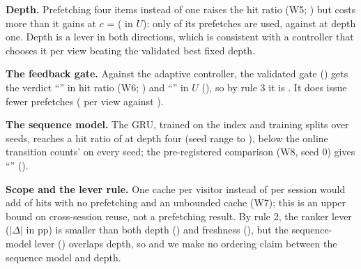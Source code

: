 \textbf{Depth.} Prefetching four items instead of one raises the hit ratio
(W5; \decWebWFiveHitDepthCI) but costs more than it gains at $c$ =
\webHeadlineCost{} (\decWebWFiveUtilityDepthCI{} in $U$): only
\webPrecisionLogisticCapEightFixedFour{} of its prefetches are used, against
\webPrecisionLogisticCapEightFixedOne{} at depth one. Depth is a lever in both
directions, which is consistent with a controller that chooses it per view
beating the validated best fixed depth.

\textbf{The feedback gate.} Against the adaptive controller, the validated
gate (\polFeedback) gets the verdict ``\decWebWSixHitFeedbackVerdict'' in hit
ratio (W6; \decWebWSixHitFeedbackCI) and ``\decWebWSixUtilityFeedbackVerdict''
in $U$ (\decWebWSixUtilityFeedbackCI), so by rule 3 it is
\decWebRuleThreeVerdict. It does issue fewer prefetches
(\webIssuedLogisticCapEightFeedbackZeroPointZeroOneEpsZeroPointZeroZeroFive{} per
view against \webIssuedLogisticCapEightAdaptiveZeroPointZeroOne).

\textbf{The sequence model.} The GRU, trained on the index and training splits
over \webSeqGruFinalCapEightFixedFourCostZeroPointZeroOneSeeds{} seeds, reaches
a hit ratio of \webSeqGruFinalCapEightFixedFourCostZeroPointZeroOneCacheHit{} at
depth four (seed range
\webSeqGruFinalCapEightFixedFourCostZeroPointZeroOneCacheHitMin{} to
\webSeqGruFinalCapEightFixedFourCostZeroPointZeroOneCacheHitMax), below the
online transition counts' \webHitTransOnlineCapEightFixedFour{} on every seed;
the pre-registered comparison (W8, seed 0) gives
``\decWebWEightHitSequenceModelVerdict'' (\decWebWEightHitSequenceModelCI).

\textbf{Scope and the lever rule.} One cache per visitor instead of per
session would add \decWebWSevenHitCacheScopeCI{} of hits with no prefetching
and an unbounded cache (W7); this is an upper bound on cross-session reuse,
not a prefetching result. By rule 2, the ranker lever
($|\Delta|$ in \decWebPredictorSmallestRankerCI{} pp) is smaller than both
depth (\decWebPredictorSmallestDepthCI) and freshness
(\decWebPredictorSmallestFreshnessCI), but the sequence-model lever
(\decWebPredictorSmallestSequenceModelCI) overlaps depth, so
\decWebPredictorSmallestVerdict{} and we make no ordering claim between the
sequence model and depth.

